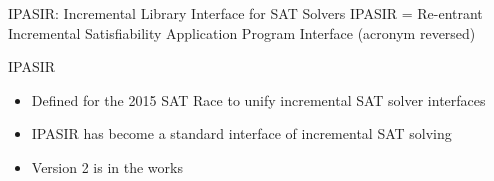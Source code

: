 \documentclass[t]{sdqbeamer}
\begin{document}
\begin{frame}{IPASIR: Incremental Library Interface for SAT Solvers}
IPASIR = Re-entrant Incremental Satisfiability Application Program Interface (acronym reversed)

\begin{block}{IPASIR}
	\begin{itemize}\setlength{\itemsep}{1em}
		\item Defined for the 2015 SAT Race to unify incremental SAT solver interfaces
		\item IPASIR has become a standard interface of incremental SAT solving
		\item<2> Version 2 is in the works
	\end{itemize}
\end{block}~\\[.5em]
\centering
\end{frame}
\end{document}
